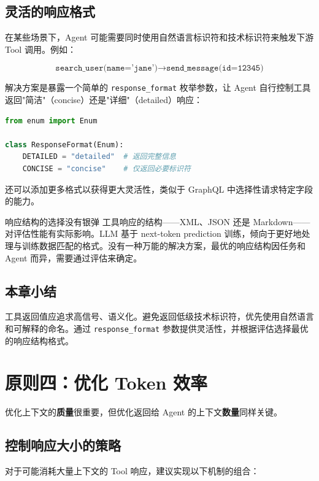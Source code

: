 \documentclass[a4paper]{article}
\begin{document}
\subsection{灵活的响应格式}

在某些场景下，Agent 可能需要同时使用自然语言标识符和技术标识符来触发下游 Tool 调用。例如：

$$\texttt{search\_user(name='jane')} \rightarrow \texttt{send\_message(id=12345)}$$

解决方案是暴露一个简单的 \texttt{response\_format} 枚举参数，让 Agent 自行控制工具返回"简洁"（concise）还是"详细"（detailed）响应：

\begin{lstlisting}[language=Python, caption={ResponseFormat 枚举示例}]
from enum import Enum

class ResponseFormat(Enum):
    DETAILED = "detailed"  # 返回完整信息
    CONCISE = "concise"    # 仅返回必要标识符
\end{lstlisting}

还可以添加更多格式以获得更大灵活性，类似于 GraphQL 中选择性请求特定字段的能力。

\begin{warningbox}{响应结构的选择没有银弹}
工具响应的结构——XML、JSON 还是 Markdown——对评估性能有实际影响。LLM 基于 next-token prediction 训练，倾向于更好地处理与训练数据匹配的格式。没有一种万能的解决方案，最优的响应结构因任务和 Agent 而异，需要通过评估来确定。
\end{warningbox}

\subsection{本章小结}

工具返回值应追求高信号、语义化。避免返回低级技术标识符，优先使用自然语言和可解释的命名。通过 \texttt{response\_format} 参数提供灵活性，并根据评估选择最优的响应结构格式。


\section{原则四：优化 Token 效率}

优化上下文的\textbf{质量}很重要，但优化返回给 Agent 的上下文\textbf{数量}同样关键。

\subsection{控制响应大小的策略}

对于可能消耗大量上下文的 Tool 响应，建议实现以下机制的组合：
\end{document}

